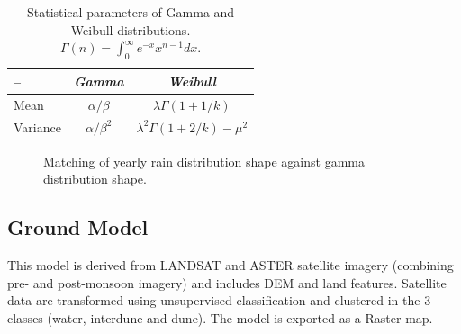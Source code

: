 \documentclass[11pt,oneside,a4paper,openright]{report}
\begin{document}

	\begin{table}[h]
	\centering
	\begin{tabular}{|l|c||c|}
		\hline
		--		&\emph{Gamma} 		& \emph{Weibull}\\
		\hline
		Mean		&$\alpha/\beta$		& $\lambda\Gamma(1+1/k)$ \\
		\hline
		Variance	&$\alpha/\beta^2$	& $\lambda^2\Gamma(1+2/k)-\mu^2$ \\
		\hline
	\end{tabular}
	\caption{Statistical parameters of Gamma and Weibull distributions.
		$\Gamma(n) = \int^{\infty}_{0} e^{-x}x^{n-1}dx$.    }
	\label{tab:GammaVSWeibull}
	\end{table}

\begin{figure}[h]
\centering
\setlength\fboxsep{0pt}
\setlength\fboxrule{0.5pt}
\caption{Matching of yearly rain distribution shape against gamma distribution shape.}
\label{fig:GammaRain}
\end{figure}





\subsection{Ground Model}
This model is derived from LANDSAT and ASTER satellite imagery (combining pre- and post-monsoon
imagery) and includes DEM and land features. Satellite data are transformed using unsupervised
classification and clustered in the 3 classes (water, interdune and dune). The model is exported as a
Raster map.
\end{document}
